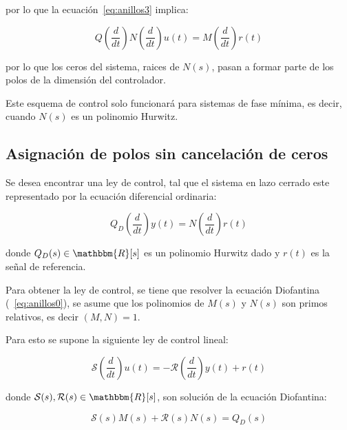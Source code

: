             por lo que la ecuación~\ref{eq:anillos3} implica:

            \begin{equation}
                Q \left( \frac{d}{dt} \right) N \left( \frac{d}{dt} \right) u(t) = M \left( \frac{d}{dt} \right) r(t)
            \end{equation}

            por lo que los ceros del sistema, raices de $N(s)$, pasan a formar parte de los polos de la dimensión del controlador.

            Este esquema de control solo funcionará para sistemas de fase mínima, es decir, cuando $N(s)$ es un polinomio Hurwitz.

            \subsection{Asignación de polos sin cancelación de ceros}

            Se desea encontrar una ley de control, tal que el sistema en lazo cerrado este representado por la ecuación diferencial ordinaria:

            \begin{equation}
                Q_D \left( \frac{d}{dt} \right) y(t) = N \left( \frac{d}{dt} \right) r(t)
            \end{equation}

            donde $Q_D(s) \in \mathbbm{R}[s]$ es un polinomio Hurwitz dado y $r(t)$ es la señal de referencia.

            Para obtener la ley de control, se tiene que resolver la ecuación Diofantina (~\ref{eq:anillos0}), se asume que los polinomios de $M(s)$ y $N(s)$ son primos relativos, es decir $(M, N) = 1$.

            Para esto se supone la siguiente ley de control lineal:

            \begin{equation} \label{eq:anillos4}
                \mathcal{S} \left( \frac{d}{dt} \right) u(t) = - \mathcal{R} \left( \frac{d}{dt} \right) y(t) + r(t)
            \end{equation}

            donde $\mathcal{S}(s), \mathcal{R}(s) \in \mathbbm{R}[s]$, son solución de la ecuación Diofantina:

            \begin{equation} \label{eq:anillos5}
                \mathcal{S}(s) M(s) + \mathcal{R}(s) N(s) = Q_D(s)
            \end{equation}


